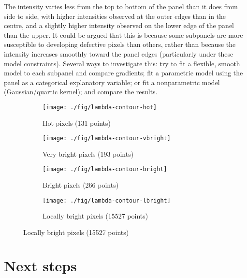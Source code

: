 \documentclass[10pt,fleqn]{article}
\begin{document}
The intensity varies less from the top to bottom of the panel than it does from side to side, with higher intensities observed at the outer edges than in the centre, and a slightly higher intensity observed on the lower edge of the panel than the upper. It could be argued that this is because some subpanels are more susceptible to developing defective pixels than others, rather than because the intensity increases smoothly toward the panel edges (particularly under these model constraints). Several ways to investigate this: try to fit a flexible, smooth model to each subpanel and compare gradients; fit a parametric model using the panel as a categorical explanatory variable; or fit a nonparametric model (Gaussian/quartic kernel); and compare the results.

\begin{figure}[!ht]
\centering
\caption{Log-linear Poisson processes fitted to each bad pixel type \emph{(Contours are labelled with $\lambda(x)$)}}

\begin{subfigure}[t]{0.49\textwidth}
\caption{Hot pixels (131 points)}
\texttt{[image: ./fig/lambda-contour-hot]}
\end{subfigure}
%
\begin{subfigure}[t]{0.49\textwidth}
\caption{Very bright pixels (193 points)}
\texttt{[image: ./fig/lambda-contour-vbright]}
\end{subfigure}

\vspace*{10pt}

\begin{subfigure}[t]{0.49\textwidth}
\caption{Bright pixels (266 points)}
\texttt{[image: ./fig/lambda-contour-bright]}
\end{subfigure}
%
\begin{subfigure}[t]{0.49\textwidth}
\caption{Locally bright pixels (15527 points)}
\texttt{[image: ./fig/lambda-contour-lbright]}
\end{subfigure}

\end{figure}

\FloatBarrier
\hrulefill

\section*{Next steps}

\end{document}
